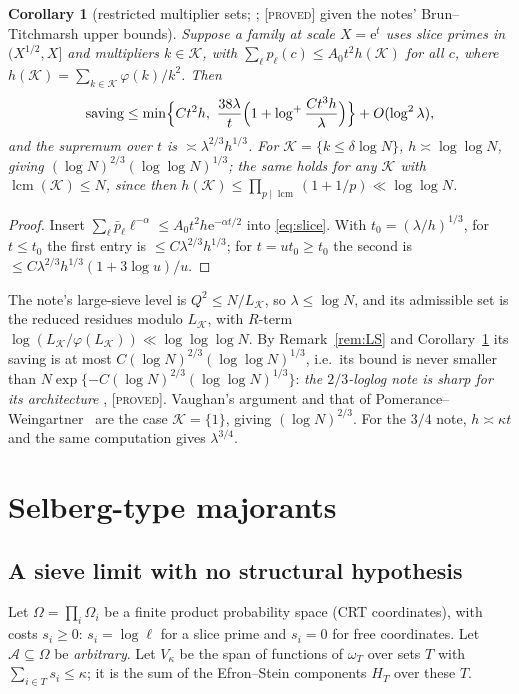\documentclass[10pt,reqno]{amsart}
\newtheorem{corollary}[theorem]{Corollary}
\theoremstyle{definition}
\theoremstyle{remark}
\newcommand{\A}{\mathcal A}
\newcommand{\lcm}{\operatorname{lcm}}
\newcommand{\e}{\mathrm e}
\newcommand{\lab}[1]{\textup{[\textsc{#1}]}}
\begin{document}
\begin{corollary}[restricted multiplier sets; {\cite[Cor.~3.5]{ET}}; \lab{proved} given the notes' Brun--Titchmarsh upper bounds]\label{cor:restricted}
Suppose a family at scale $X=\e^t$ uses slice primes in $(X^{1/2},X]$ and
multipliers $k\in\mathcal K$, with $\sum_\ell p_\ell(c)\leq A_0t^2h(\mathcal K)$
for all $c$, where $h(\mathcal K)=\sum_{k\in\mathcal K}\varphi(k)/k^2$.  Then
\[
 \text{saving}\leq\min\Bigl\{Ct^2h,\ \frac{38\lambda}t\Bigl(1+\log^+\frac{Ct^3h}\lambda\Bigr)\Bigr\}+O(\log^2\lambda),
\]
and the supremum over $t$ is $\asymp\lambda^{2/3}h^{1/3}$.  For
$\mathcal K=\{k\leq\delta\log N\}$, $h\asymp\log\log N$, giving
$(\log N)^{2/3}(\log\log N)^{1/3}$; the same holds for any $\mathcal K$ with
$\lcm(\mathcal K)\leq N$, since then
$h(\mathcal K)\leq\prod_{p\mid\lcm}(1+1/p)\ll\log\log N$.
\end{corollary}
\begin{proof}
Insert $\sum_\ell\bar p_\ell\ell^{-\alpha}\leq A_0t^2h\e^{-\alpha t/2}$ into
\eqref{eq:slice}.  With $t_0=(\lambda/h)^{1/3}$, for $t\leq t_0$ the first
entry is $\leq C\lambda^{2/3}h^{1/3}$; for $t=ut_0\geq t_0$ the second is
$\leq C\lambda^{2/3}h^{1/3}(1+3\log u)/u$.
\end{proof}
The note's large-sieve level is $Q^2\leq N/L_{\mathcal K}$, so
$\lambda\leq\log N$, and its admissible set is the reduced residues modulo
$L_{\mathcal K}$, with $R$-term
$\log(L_{\mathcal K}/\varphi(L_{\mathcal K}))\ll\log\log\log N$.
By Remark~\ref{rem:LS} and Corollary~\ref{cor:restricted} its saving is
at most $C(\log N)^{2/3}(\log\log N)^{1/3}$, i.e.\ its bound is never
smaller than $N\exp\{-C(\log N)^{2/3}(\log\log N)^{1/3}\}$: \emph{the $2/3$-loglog
note is sharp for its architecture}
\cite[Lemma~4.4]{ET}, \lab{proved}.
Vaughan's argument and that of Pomerance--Weingartner~\cite{PW} are the
case $\mathcal K=\{1\}$, giving $(\log N)^{2/3}$.  For the $3/4$ note,
$h\asymp\kappa t$ and the same computation gives $\lambda^{3/4}$.

\section{Selberg-type majorants}\label{sec:selberg}

\subsection{A sieve limit with no structural hypothesis}
Let $\Omega=\prod_i\Omega_i$ be a finite product probability space (CRT
coordinates), with costs $s_i\geq0$: $s_i=\log\ell$ for a slice prime and
$s_i=0$ for free coordinates.  Let $\A\subseteq\Omega$ be \emph{arbitrary}.
Let $V_\kappa$ be the span of functions of $\omega_T$ over sets $T$ with
$\sum_{i\in T}s_i\leq\kappa$; it is the sum of the Efron--Stein components
$H_T$ over these $T$.
\end{document}
